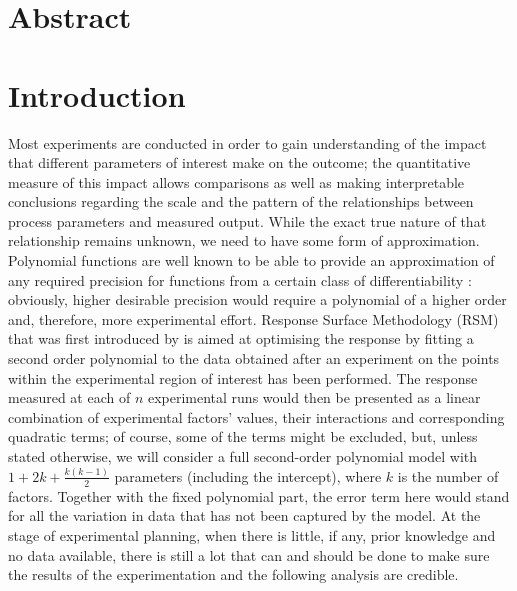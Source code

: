 \documentclass[11pt]{article}
\begin{document}
\tableofcontents

\newpage
\section{Abstract}

\section{Introduction}

\begin{Large}
	
\end{Large}

Most experiments are conducted in order to gain understanding of the impact that different parameters of interest make on the outcome; the quantitative measure of this impact allows comparisons as well as making interpretable conclusions regarding the scale and the pattern of the relationships between process parameters and measured output. 
While the exact true nature of that relationship remains unknown, we need to have some form of approximation. Polynomial functions are well known to be able to provide an approximation of any required precision for functions from a certain class of differentiability \citep{Rudin1987real}: obviously, higher desirable precision would require a polynomial of a higher order and, therefore, more experimental effort. Response Surface Methodology (RSM) that was first introduced by \cite{Box1951Roy} is aimed at optimising the response by fitting a second order polynomial to the data obtained after an experiment on the points within the experimental region of interest has been performed. The response measured at each of $n$ experimental runs would then be presented as a linear combination of experimental factors' values, their interactions and corresponding quadratic terms; of course, some of the terms might be excluded, but, unless stated otherwise, we will consider a full second-order polynomial model with $1+2k+\frac{k(k-1)}{2}$ parameters (including the intercept), where $k$ is the number of factors. Together with the fixed polynomial part, the error term here would stand for all the variation in data that has not been captured by the model. 
At the stage of experimental planning, when there is little, if any, prior knowledge and no data available, there is still a lot that can and should be done to make sure the results of the experimentation and the following analysis are credible.
\end{document}
